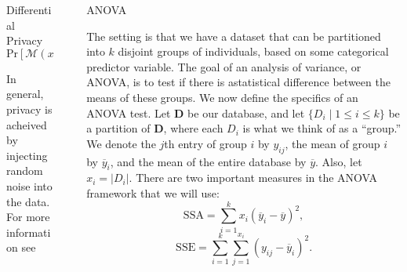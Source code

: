 \documentclass[final]{beamer}
\newlength{\sepwid}
\newlength{\onecolwid}
\newlength{\twocolwid}
\begin{document}
\begin{frame}[t]
\begin{columns}[t]
\begin{column}{\onecolwid}
\begin{block}{Differential Privacy}
\[
\text{Pr}[\mathcal{M}(x) \in \mathcal{S}] \leq \exp(\epsilon) \text{Pr}[\mathcal{M}(y) \in \mathcal{S}].
\]

In general, privacy is acheived by injecting random noise into the data. For more information see \cite{dwork2014algorithmic}


\end{block}



\end{column} %

\begin{column}{\sepwid}\end{column} %

\begin{column}{\twocolwid} %

\begin{columns}[t,totalwidth=\twocolwid] %

\begin{column}{\onecolwid}\vspace{-.6in} %


\begin{block}{ANOVA}

The setting is that we have a dataset that can be partitioned into $k$ disjoint groups of 
individuals, based on some categorical predictor variable. The goal of an analysis of variance, or ANOVA, is to test if there is astatistical difference between the means of these groups. 
We now define the specifics of an ANOVA test.
Let $\textbf{D}$ be our database, and let $\{D_i \; |\; 1\leq i\leq k \}$ be a partition of 
$\textbf{D}$, where each $D_i$ is what we think of as a ``group.'' We denote the $j$th entry of group $i$ by $y_{ij}$, the mean of group $i$ by $\overline{y}_i$, and the mean of the entire 
database by $\overline{y}$. Also, let $x_i = |D_i|$. 
There are two important measures in the ANOVA framework that we will use:
\[
\text{SSA} = \sum_{i=1}^{k} x_i(\overline{y}_i - \overline{y})^2,
\]
\[
\text{SSE} = \sum_{i=1}^{k} \sum_{j=1}^{x_i} (y_{ij} - \overline{y}_i)^2.
\]


\end{block}
\end{column}
\end{columns}
\end{column}
\end{columns}
\end{frame}
\end{document}
